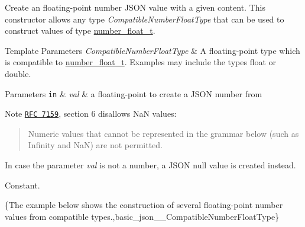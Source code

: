 Create an floating-\/point number J\-S\-O\-N value with a given content. This constructor allows any type {\itshape Compatible\-Number\-Float\-Type} that can be used to construct values of type \hyperlink{classnlohmann_1_1basic__json_a74a0013e847fdc574b48f931f0e757e1}{number\-\_\-float\-\_\-t}.


\begin{DoxyTemplParams}{Template Parameters}
{\em Compatible\-Number\-Float\-Type} & A floating-\/point type which is compatible to \hyperlink{classnlohmann_1_1basic__json_a74a0013e847fdc574b48f931f0e757e1}{number\-\_\-float\-\_\-t}. Examples may include the types {\ttfamily float} or {\ttfamily double}.\\
\hline
\end{DoxyTemplParams}

\begin{DoxyParams}[1]{Parameters}
\mbox{\tt in}  & {\em val} & a floating-\/point to create a J\-S\-O\-N number from\\
\hline
\end{DoxyParams}
\begin{DoxyNote}{Note}
\href{http://www.rfc-editor.org/rfc/rfc7159.txt}{\tt R\-F\-C 7159}, section 6 disallows Na\-N values\-: \begin{quotation}
Numeric values that cannot be represented in the grammar below (such as Infinity and Na\-N) are not permitted.

\end{quotation}
In case the parameter {\itshape val} is not a number, a J\-S\-O\-N null value is created instead.
\end{DoxyNote}
Constant.

\{The example below shows the construction of several floating-\/point number values from compatible types.,basic\-\_\-json\-\_\-\-\_\-\-Compatible\-Number\-Float\-Type\}

